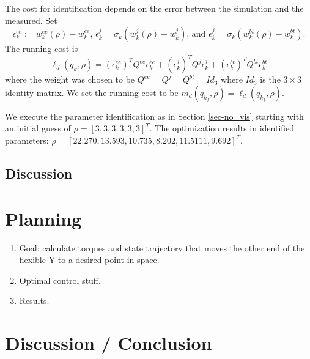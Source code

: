 \documentclass[runningheads,a4paper]{llncs}
\begin{document}
The cost for identification depends on the error between the simulation and the measured. Set
\[
\epsilon^{ee}_k := w^{ee}_k(\rho)-\overline{w}^{ee}_k \textrm{, } \epsilon^{j}_k = \sigma_k(w^j_k(\rho)-\overline{w}^j_k) \textrm{, and } \epsilon^{j}_k = \sigma_k(w^{bt}_k(\rho)-\overline{w}^{bt}_k).
\]
The running cost is 
\[
\ell_d(q_k,\rho) = (\epsilon^{ee}_k)^TQ^{ee}\epsilon^{ee}_k + (\epsilon^{j}_k)^TQ^{j}\epsilon^{j}_k + (\epsilon^{bt}_k)^TQ^{bt}\epsilon^{bt}_k
\]
where the weight was chosen to be $Q^{ee} = Q^{j} = Q^{bt} = Id_{3}$ where $Id_{3}$ is the $3\times3$ identity matrix.  We set the running cost to be $m_d(q_{k_f},\rho) = \ell_d(q_{k_f},\rho)$.

We execute the parameter identification as in Section \ref{sec-no_vis} starting with an initial guess of $\rho = [3, 3, 3, 3, 3, 3]^T$. The optimization results in identified parameters: $\rho = [22.270 , 13.593 , 10.735 ,  8.202  ,11.5111,   9.692]^T$.

\subsection{Discussion}



\section{Planning}
\begin{enumerate}
\item Goal: calculate torques and state trajectory that moves the other end of the flexible-Y to a desired point in space.
\item Optimal control stuff.
\item Results.
\end{enumerate}

\section{Discussion / Conclusion}




\end{document}
